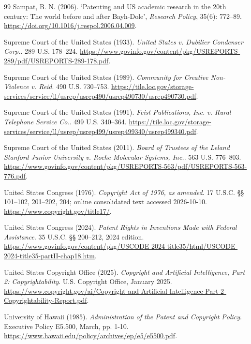 \begin{thebibliography}{99}
 Sampat, B. N. (2006). `Patenting and US academic research in the 20th century: The world before and after Bayh-Dole', \emph{Research Policy}, 35(6): 772--89. \url{https://doi.org/10.1016/j.respol.2006.04.009}.

 Supreme Court of the United States (1933). \emph{United States v. Dubilier Condenser Corp.}. 289 U.S. 178–224. \url{https://www.govinfo.gov/content/pkg/USREPORTS-289/pdf/USREPORTS-289-178.pdf}.

 Supreme Court of the United States (1989). \emph{Community for Creative Non-Violence v. Reid}. 490 U.S. 730–753. \url{https://tile.loc.gov/storage-services/service/ll/usrep/usrep490/usrep490730/usrep490730.pdf}.

 Supreme Court of the United States (1991). \emph{Feist Publications, Inc. v. Rural Telephone Service Co.}. 499 U.S. 340–364. \url{https://tile.loc.gov/storage-services/service/ll/usrep/usrep499/usrep499340/usrep499340.pdf}.

 Supreme Court of the United States (2011). \emph{Board of Trustees of the Leland Stanford Junior University v. Roche Molecular Systems, Inc.}. 563 U.S. 776–803. \url{https://www.govinfo.gov/content/pkg/USREPORTS-563/pdf/USREPORTS-563-776.pdf}.

 United States Congress (1976). \emph{Copyright Act of 1976, as amended}. 17 U.S.C. §§ 101–102, 201–202, 204; online consolidated text accessed 2026-10-10. \url{https://www.copyright.gov/title17/}.

 United States Congress (2024). \emph{Patent Rights in Inventions Made with Federal Assistance}. 35 U.S.C. §§ 200–212, 2024 edition. \url{https://www.govinfo.gov/content/pkg/USCODE-2024-title35/html/USCODE-2024-title35-partII-chap18.htm}.

 United States Copyright Office (2025). \emph{Copyright and Artificial Intelligence, Part 2: Copyrightability}. U.S. Copyright Office, January 2025. \url{https://www.copyright.gov/ai/Copyright-and-Artificial-Intelligence-Part-2-Copyrightability-Report.pdf}.

 University of Hawaii (1985). \emph{Administration of the Patent and Copyright Policy}. Executive Policy E5.500, March, pp. 1-10. \url{https://www.hawaii.edu/policy/archives/ep/e5/e5500.pdf}.


\end{thebibliography}
